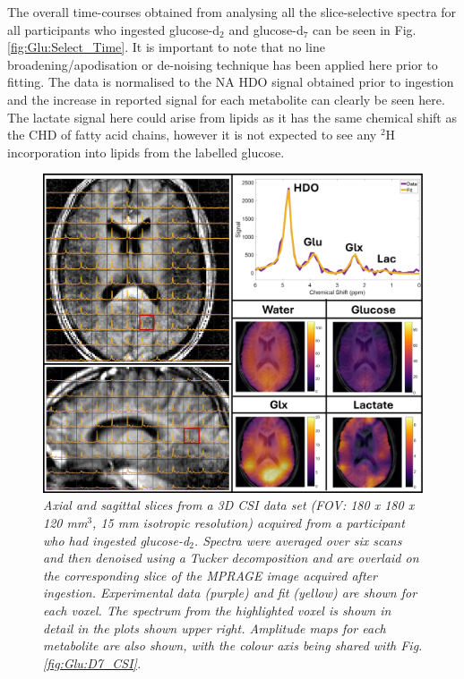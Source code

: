 The overall time-courses obtained from analysing all the slice-selective spectra for all participants who ingested glucose-d$_2$ and glucose-d$_7$ can be seen in Fig. \ref{fig:Glu:Select_Time}. It is important to note that no line broadening/apodisation or de-noising technique has been applied here prior to fitting. The data is normalised to the \ac{NA} HDO signal obtained prior to ingestion and the increase in reported signal for each metabolite can clearly be seen here. The lactate signal here could arise from lipids as it has the same chemical shift as the CHD of fatty acid chains, however it is not expected to see any $^2$H incorporation into lipids from the labelled glucose.  

\begin{figure}
    \centering
    \includegraphics[width = 1\textwidth]{Figures/Glucose/D2_CSI.png}
    \caption{\textit{Axial and sagittal slices from a 3D \ac{CSI} data set (\ac{FOV}: 180 {\normalfont x} 180 {\normalfont x} 120 mm$^3$, 15 mm isotropic resolution) acquired from a participant who had ingested glucose-d$_2$. Spectra were averaged over six scans and then denoised using a Tucker decomposition and are overlaid on the corresponding slice of the \ac{MPRAGE} image acquired after ingestion. Experimental data (purple) and fit (yellow) are shown for each voxel. The spectrum from the highlighted voxel is shown in detail in the plots shown upper right. Amplitude maps for each metabolite are also shown, with the colour axis being shared with Fig. \ref{fig:Glu:D7_CSI}.}}
    \label{fig:Glu:D2_CSI}
\end{figure}

